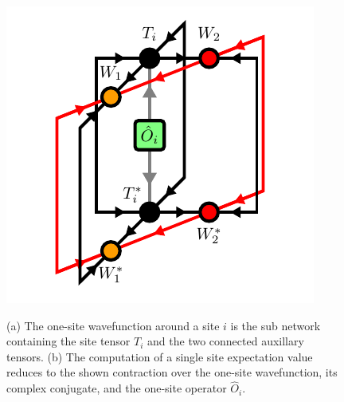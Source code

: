 \begin{figure}
	\centering
	\subcaptionbox{\label{fig:disoTPS_onesite_expectation_value_environment}}
	{%
		\usebox{\largestimage}
	}
	\quad\quad
	\subcaptionbox{\label{fig:disoTPS_onesite_expectation_value_computation}}
	{%
		\raisebox{\dimexpr.5\ht\largestimagea-.5\height}
		{%
			\includegraphics[scale=1.0]{figures/tikz/disoTPS/one_site_expectation_value/one_site_expectation_value_b.pdf}
		}
	}
	\caption{(a) The one-site wavefunction around a site $i$ is the sub network containing the site tensor $T_i$ and the two connected auxillary tensors. (b) The computation of a single site expectation value reduces to the shown contraction over the one-site wavefunction, its complex conjugate, and the one-site operator $\hat{O}_i$.}
	\label{fig:disoTPS_onesite_expectation_value}
\end{figure}
